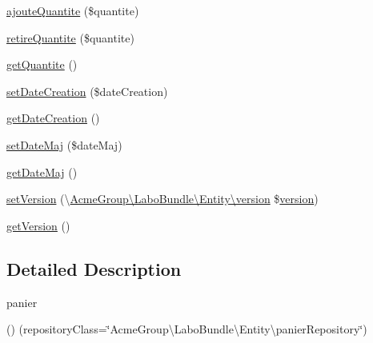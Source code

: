 \begin{DoxyCompactItemize}
\item 
\hyperlink{class_acme_group_1_1_labo_bundle_1_1_entity_1_1panier_a7a815e0085665972814c9834a4c28f42}{ajoute\+Quantite} (\$quantite)
\item 
\hyperlink{class_acme_group_1_1_labo_bundle_1_1_entity_1_1panier_a44dfdc18a041a380f4a437a83efbf93a}{retire\+Quantite} (\$quantite)
\item 
\hyperlink{class_acme_group_1_1_labo_bundle_1_1_entity_1_1panier_aa48a0b6b621aac4f2af3a8a169762ab7}{get\+Quantite} ()
\item 
\hyperlink{class_acme_group_1_1_labo_bundle_1_1_entity_1_1panier_aefddc3180a6afaad202c207b939bac18}{set\+Date\+Creation} (\$date\+Creation)
\item 
\hyperlink{class_acme_group_1_1_labo_bundle_1_1_entity_1_1panier_a14a9fa738ee5011e7ed687a7dc7f7997}{get\+Date\+Creation} ()
\item 
\hyperlink{class_acme_group_1_1_labo_bundle_1_1_entity_1_1panier_a02e8a95729f4eee605ecef6628265057}{set\+Date\+Maj} (\$date\+Maj)
\item 
\hyperlink{class_acme_group_1_1_labo_bundle_1_1_entity_1_1panier_a77d9cd5a88a21fe262e6da49b6c3051c}{get\+Date\+Maj} ()
\item 
\hyperlink{class_acme_group_1_1_labo_bundle_1_1_entity_1_1panier_a89c363ab56533d0f631411d34838145d}{set\+Version} (\textbackslash{}\hyperlink{class_acme_group_1_1_labo_bundle_1_1_entity_1_1version}{Acme\+Group\textbackslash{}\+Labo\+Bundle\textbackslash{}\+Entity\textbackslash{}version} \$\hyperlink{class_acme_group_1_1_labo_bundle_1_1_entity_1_1version}{version})
\item 
\hyperlink{class_acme_group_1_1_labo_bundle_1_1_entity_1_1panier_ae02833d8fd0cdd8a13de1d3c6db4763d}{get\+Version} ()
\end{DoxyCompactItemize}


\subsection{Detailed Description}
panier

() (repository\+Class=\char`\"{}\+Acme\+Group\textbackslash{}\+Labo\+Bundle\textbackslash{}\+Entity\textbackslash{}panier\+Repository\char`\"{}) 


